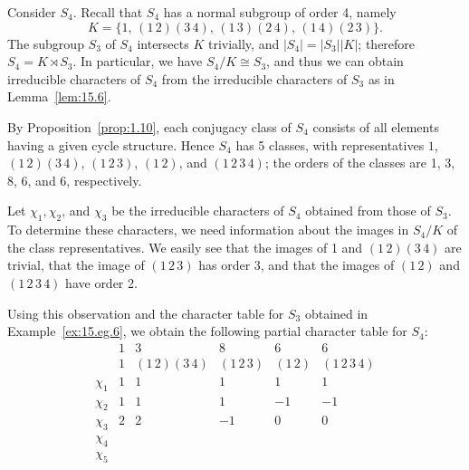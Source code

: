 \documentclass[../Odyssey_Project.tex]{subfiles}
\begin{document}
\begin{example}
\label{ex:15.eg.7}
Consider $S_4$. Recall that $S_4$ has a normal subgroup of order 4, namely
\[
    K = \{1,\, (1\,2)(3\,4),\, (1\,3)(2\,4),\, (1\,4)(2\,3)\}.
\]
The subgroup $S_3$ of $S_4$ intersects $K$ trivially, and $|S_4| = |S_3||K|$; therefore $S_4 = K \rtimes S_3$. In particular, we have $S_4/K \cong S_3$, and thus we can obtain irreducible characters of $S_4$ from the irreducible characters of $S_3$ as in Lemma~\ref{lem:15.6}.

By Proposition~\ref{prop:1.10}, each conjugacy class of $S_4$ consists of all elements having a given cycle structure. Hence $S_4$ has 5 classes, with representatives $1$, $(1\,2)(3\,4)$, $(1\,2\,3)$, $(1\,2)$, and $(1\,2\,3\,4)$; the orders of the classes are 1, 3, 8, 6, and 6, respectively.

Let $\chi_1, \chi_2$, and $\chi_3$ be the irreducible characters of $S_4$ obtained from those of $S_3$. To determine these characters, we need information about the images in $S_4/K$ of the class representatives. We easily see that the images of 1 and $(1\,2)(3\,4)$ are trivial, that the image of $(1\,2\,3)$ has order 3, and that the images of $(1\,2)$ and $(1\,2\,3\,4)$ have order 2.

Using this observation and the character table for $S_3$ obtained in Example~\ref{ex:15.eg.6}, we obtain the following partial character table for $S_4$:
\[
    \begin{array}{c|ccccc}
        & 1 & 3 & 8 & 6 & 6 \\
        & 1 & (1\,2)(3\,4) & (1\,2\,3) & (1\,2) & (1\,2\,3\,4) \\
        \hline
        \chi_1 & 1 & 1 & 1 & 1 & 1 \\
        \chi_2 & 1 & 1 & 1 & -1 & -1 \\
        \chi_3 & 2 & 2 & -1 & 0 & 0 \\
        \chi_4 & & & & & \\
        \chi_5 & & & & &
    \end{array}
\]


\end{example}
\end{document}
